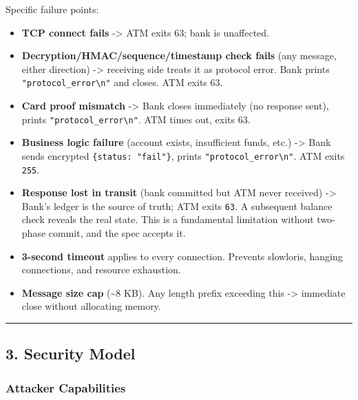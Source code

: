 \documentclass[
]{article}
\providecommand{\tightlist}{%
  \setlength{\itemsep}{0pt}\setlength{\parskip}{0pt}}
\begin{document}
Specific failure points:

\begin{itemize}
\tightlist
\item
  \textbf{TCP connect fails} -\textgreater{} ATM exits 63; bank is
  unaffected.
\item
  \textbf{Decryption/HMAC/sequence/timestamp check fails} (any message,
  either direction) -\textgreater{} receiving side treats it as protocol
  error. Bank prints \texttt{"protocol\_error\textbackslash{}n"} and
  closes. ATM exits 63.
\item
  \textbf{Card proof mismatch} -\textgreater{} Bank closes immediately
  (no response sent), prints
  \texttt{"protocol\_error\textbackslash{}n"}. ATM times out, exits 63.
\item
  \textbf{Business logic failure} (account exists, insufficient funds,
  etc.) -\textgreater{} Bank sends encrypted
  \texttt{\{status:\ "fail"\}}, prints
  \texttt{"protocol\_error\textbackslash{}n"}. ATM exits \texttt{255}.
\item
  \textbf{Response lost in transit} (bank committed but ATM never
  received) -\textgreater{} Bank's ledger is the source of truth; ATM
  exits \texttt{63}. A subsequent balance check reveals the real state.
  This is a fundamental limitation without two-phase commit, and the
  spec accepts it.
\item
  \textbf{3-second timeout} applies to every connection. Prevents
  slowloris, hanging connections, and resource exhaustion.
\item
  \textbf{Message size cap} (\textasciitilde8 KB). Any length prefix
  exceeding this -\textgreater{} immediate close without allocating
  memory.
\end{itemize}

\begin{center}\rule{0.5\linewidth}{0.5pt}\end{center}

\hypertarget{security-model}{%
\subsection{3. Security Model}\label{security-model}}

\hypertarget{attacker-capabilities}{%
\subsubsection{Attacker Capabilities}\label{attacker-capabilities}}
\end{document}
